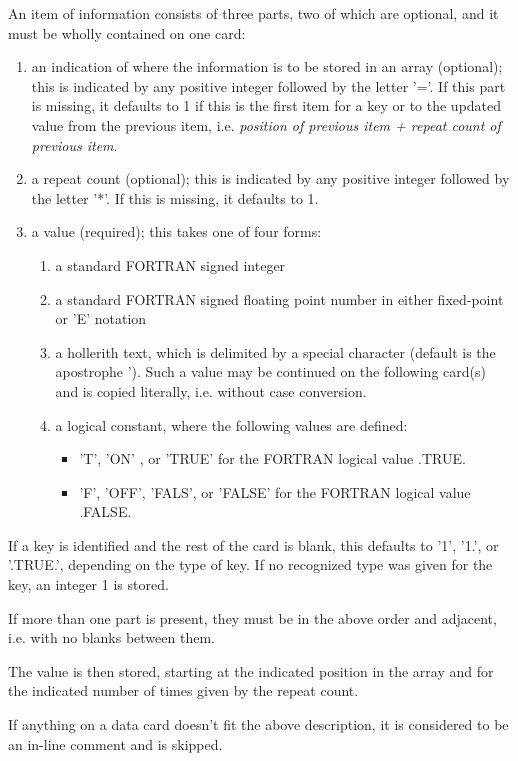 An item of information consists of three parts, two of which are optional,
and it must be wholly contained on one card:
 
\begin{enumerate}
\item
an indication of where the information is to be stored in an array
(optional); this is indicated by any positive integer followed by
the letter '='.
If this part is missing, it defaults to 1 if this is the first item for
a key or to the updated value from the previous item, i.e. {\it position of
previous item + repeat count of previous item}.
\item
a repeat count (optional); this is indicated by any positive integer
followed by the letter '*'.
If this is missing, it defaults to 1.
\item
a value (required); this takes one of four forms:
\begin{enumerate}
\item
a standard FORTRAN signed integer
\item
a standard FORTRAN signed floating point number in either fixed-point
or 'E' notation
\item
a hollerith text, which is delimited by a special character (default
is the apostrophe '). Such a value may be continued on the following
card(s) and is copied literally, i.e. without case conversion.
\item
a logical constant, where the following values are defined:
\begin{itemize}
\item
'T', 'ON' ,         or 'TRUE'  for the FORTRAN logical value .TRUE.
\item
'F', 'OFF', 'FALS', or 'FALSE' for the FORTRAN logical value .FALSE.
\end{itemize}
\end{enumerate}
\end{enumerate}
If a key is identified and the rest of the card is blank, this defaults to
'1', '1.', or '.TRUE.', depending on the type of key.
If no recognized type was given for the key, an integer 1 is stored.
 
If more than one part is present, they must be in the above order and adjacent,
i.e. with no blanks between them.
 
The value is then stored, starting at the indicated position in the array
and for the indicated number of times given by the repeat count.
 
If anything on a data card doesn't fit the above description, it is considered
to be an in-line comment and is skipped.
 
